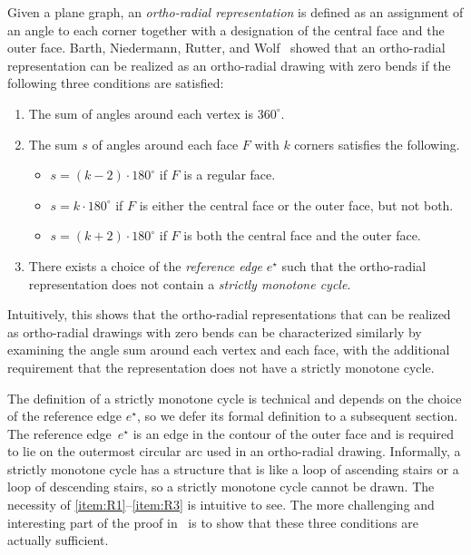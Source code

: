 \documentclass{theoretics}
\newcommand{\eref}{e^\star}
\begin{document}
Given a plane graph, an \emph{ortho-radial representation} is defined as an assignment of an angle to each corner together with a designation of the central face and the outer face.
Barth, Niedermann, Rutter, and Wolf~\cite{barth2023topology}  showed that an ortho-radial representation can be realized as an ortho-radial drawing with zero bends if the  following three conditions are satisfied:
\begin{enumerate}[(R1)]
    \item \label{item:R1} The sum of angles around each vertex is $360^\circ$.
    \item \label{item:R2} The sum $s$ of angles around each face $F$ with $k$ corners satisfies the following.
    \begin{itemize}
        \item $s = (k-2)\cdot 180^\circ$ if $F$ is a regular face.
        \item $s = k\cdot 180^\circ$ if $F$ is either the central face or the outer face, but not both.
        \item $s = (k+2) \cdot 180^\circ$ if $F$ is both the central face and the outer face.
    \end{itemize}
    \item \label{item:R3}There exists a choice of the \emph{reference edge} $\eref$ such that the ortho-radial representation does not contain a \emph{strictly monotone cycle}.
\end{enumerate}

Intuitively, this shows that the ortho-radial representations that can be realized as ortho-radial drawings with zero bends can be characterized similarly by examining the angle sum around each vertex and each face, with the additional requirement that the representation does not have a strictly monotone cycle. 


The definition of a strictly monotone cycle is  technical and depends on the choice of the reference edge $\eref$, so we defer its formal definition to a subsequent section. 
The reference edge~$\eref$ is an edge in the contour of the outer face and is required to lie on the outermost circular arc used in an ortho-radial drawing. 
Informally, a strictly monotone cycle has a structure that is like a loop of ascending stairs or a loop of descending stairs, so a strictly monotone cycle cannot be drawn. The necessity of \ref{item:R1}--\ref{item:R3} is intuitive to see. The more challenging and interesting part of the proof in~\cite{barth2023topology} is to show that these three conditions are actually sufficient.
\end{document}
